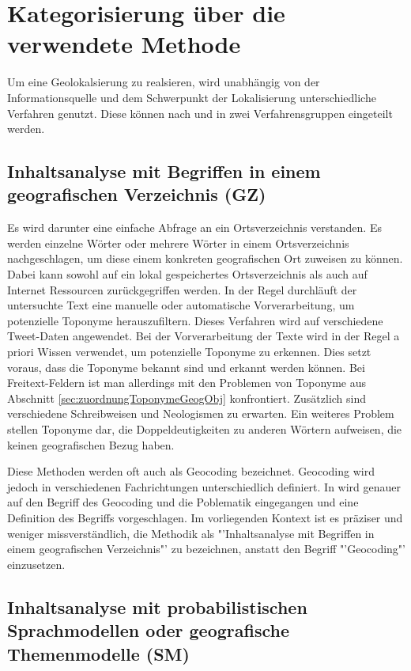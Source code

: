 	\section{Kategorisierung über die verwendete Methode}

		Um eine Geolokalsierung zu realsieren, wird unabhängig von der Informationsquelle und dem Schwerpunkt der Lokalisierung unterschiedliche Verfahren genutzt.
		Diese können nach \cite{Schulz2013} und \cite{Cheng2010} in zwei Verfahrensgruppen eingeteilt werden.

		\subsection{Inhaltsanalyse mit Begriffen in einem geografischen Verzeichnis (GZ)}  
	
			Es wird darunter eine einfache Abfrage an ein Ortsverzeichnis verstanden. 
			Es werden einzelne Wörter oder mehrere Wörter in einem Ortsverzeichnis nachgeschlagen, um diese einem konkreten geografischen Ort zuweisen zu können.
			Dabei kann sowohl auf ein lokal gespeichertes Ortsverzeichnis als auch auf Internet Ressourcen zurückgegriffen werden.  
			In der Regel durchläuft der untersuchte Text eine manuelle oder automatische Vorverarbeitung, um potenzielle Toponyme herauszufiltern. 
			Dieses Verfahren wird auf verschiedene Tweet-Daten angewendet.
			Bei der Vorverarbeitung der Texte wird in der Regel a priori Wissen verwendet, um potenzielle Toponyme zu erkennen.
			Dies setzt voraus, dass die Toponyme bekannt sind und erkannt werden können. 
			Bei Freitext-Feldern ist man allerdings mit den Problemen von Toponyme aus Abschnitt \ref{sec:zuordnungToponymeGeogObj} konfrontiert.
			Zusätzlich sind verschiedene Schreibweisen und Neologismen zu erwarten. 
			Ein weiteres Problem stellen Toponyme dar, die Doppeldeutigkeiten zu anderen Wörtern aufweisen, die keinen geografischen Bezug haben.

			Diese Methoden werden oft auch als Geocoding bezeichnet. 
			Geocoding wird jedoch in verschiedenen Fachrichtungen unterschiedlich definiert. 
			In \cite{bibsmaniaaa:Goldberg2008} wird genauer auf den Begriff des Geocoding und die Poblematik eingegangen und eine Definition  des Begriffs vorgeschlagen.
			Im vorliegenden Kontext ist es präziser und weniger missverständlich, die Methodik als "'Inhaltsanalyse mit Begriffen in einem geografischen Verzeichnis"' zu bezeichnen, anstatt den Begriff "'Geocoding"' einzusetzen. 

		\subsection{Inhaltsanalyse mit probabilistischen Sprachmodellen oder geografische Themenmodelle (SM)}

